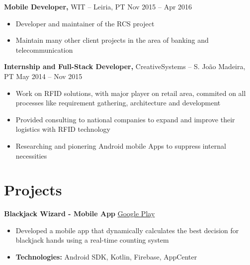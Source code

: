 \documentclass[11pt]{article}       %
\begin{document}
\textbf{Mobile Developer,} {WIT} -- Leiria, PT \hfill Nov 2015 -- Apr 2016 \\
\vspace{-9pt}
\begin{itemize}
  \item Developer and maintainer of the RCS project
  \item Maintain many other client projects in the area of banking and telecommunication
\end{itemize}

\textbf{Internship and Full-Stack Developer,} {CreativeSystems} -- S. João Madeira, PT \hfill May 2014 -- Nov 2015 \\
\vspace{-9pt}
\begin{itemize}
  \item Work on RFID solutions, with major player on retail area, commited on all processes like requirement gathering, architecture and development
  \item Provided consulting to national companies to expand and improve their logistics with RFID technology
  \item Researching and pionering Android mobile Apps to suppress internal necessities
\end{itemize}


\vspace{-18.5pt}

\section*{Projects}
\textbf{Blackjack Wizard - Mobile App} \hfill \href{https://play.google.com/store/apps/details?id=pt.psilva.blackjackwizard.demo&pcampaignid=web_share}{Google Play} \\
\vspace{-9pt}
\begin{itemize}
  \item Developed a mobile app that dynamically calculates the best decision for blackjack hands using a real-time counting system
  \item \textbf{Technologies:} Android SDK, Kotlin, Firebase, AppCenter
\end{itemize}
\end{document}
